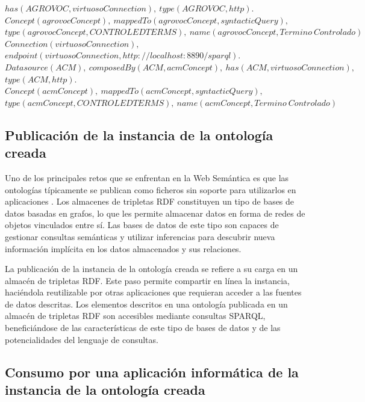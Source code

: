 \begin{minipage}{\textwidth}
$has(AGROVOC, virtuosoConnection), \ type(AGROVOC,http).$ \\
$Concept(agrovocConcept), \ mappedTo(agrovocConcept, syntacticQuery), $\\
$type(agrovocConcept, CONTROLEDTERMS), \ name(agrovocConcept, Termino \ Controlado)$\\
$Connection(virtuosoConnection),$
$endpoint(virtuosoConnection, http{:}//localhost{:}8890/sparql).$\\
$Datasource(ACM), \ composedBy(ACM, acmConcept), \ has(ACM, virtuosoConnection),$\\
$type(ACM,http).$ \\
$Concept(acmConcept), \ mappedTo(acmConcept,syntacticQuery),$\\
$type(acmConcept,CONTROLEDTERMS),  \ name(acmConcept, Termino \ Controlado)$\\
\label{onto:auctoritasDescription}
\end{minipage}

\subsection{Publicación de la instancia de la ontología creada}

Uno de los principales retos que se enfrentan en la Web Semántica es que las ontologías típicamente se publican como ficheros sin soporte para utilizarlos en aplicaciones \citep{viljanen2008publishing}. Los almacenes de tripletas RDF constituyen un tipo de bases de datos basadas en grafos, lo que les permite almacenar datos en forma de redes de objetos vinculados entre sí. Las bases de datos de este tipo son  capaces de gestionar consultas semánticas y utilizar inferencias para descubrir nueva información implícita en los datos almacenados y sus relaciones.

La publicación de la instancia de la ontología creada se refiere a su carga en un almacén de tripletas RDF. Este paso permite compartir en línea la instancia, haciéndola reutilizable por otras aplicaciones que requieran acceder a las fuentes de datos descritas. Los elementos descritos en una ontología publicada en un almacén de tripletas RDF son accesibles mediante consultas SPARQL, beneficiándose de las características de este tipo de bases de datos y de las potencialidades del lenguaje de consultas.

\subsection{Consumo por una aplicación informática de la instancia de la ontología creada}

